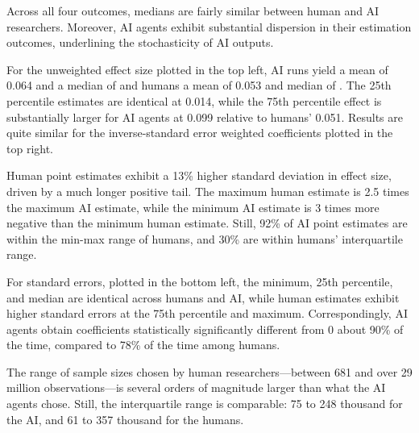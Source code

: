 \documentclass[
  12pt]{article}
\begin{document}
Across all four outcomes, medians are fairly similar between human and
AI researchers. Moreover, AI agents exhibit substantial dispersion in
their estimation outcomes, underlining the stochasticity of AI outputs.

\begin{table}[!htbp]
\centering
\caption{Summary statistics on estimation outcomes}
\label{tab:appendix-summary-nhk}
\small
\resizebox{\textwidth}{!}{}
\caption*{\footnotesize \textbf{Notes:} Panel A reports outcomes from the AI agent sample. Panel B restates the published Task 1 panel of Table 3 of \citet{huntingtonklein2025sources}. Treated-group sample size not available for all AI agent runs since its collection was added after the initial runs.}
\end{table}

For the unweighted effect size plotted in the top left, AI runs yield a
mean of 0.064 and a median of \aiMedianEffect{} and humans a mean of
0.053 and median of \benchmarkMedianEffect{}. The 25th percentile
estimates are identical at 0.014, while the 75th percentile effect is
substantially larger for AI agents at 0.099 relative to humans' 0.051.
Results are quite similar for the inverse-standard error weighted
coefficients plotted in the top right.

Human point estimates exhibit a 13\% higher standard deviation in effect
size, driven by a much longer positive tail. The maximum human estimate
is 2.5 times the maximum AI estimate, while the minimum AI estimate is 3
times more negative than the minimum human estimate. Still, 92\% of AI
point estimates are within the min-max range of humans, and 30\% are
within humans' interquartile range.

For standard errors, plotted in the bottom left, the minimum, 25th
percentile, and median are identical across humans and AI, while human
estimates exhibit higher standard errors at the 75th percentile and
maximum. Correspondingly, AI agents obtain coefficients statistically
significantly different from 0 about 90\% of the time, compared to 78\%
of the time among humans.

The range of sample sizes chosen by human researchers---between 681 and
over 29 million observations---is several orders of magnitude larger
than what the AI agents chose. Still, the interquartile range is
comparable: 75 to 248 thousand for the AI, and 61 to 357 thousand for
the humans.
\end{document}
